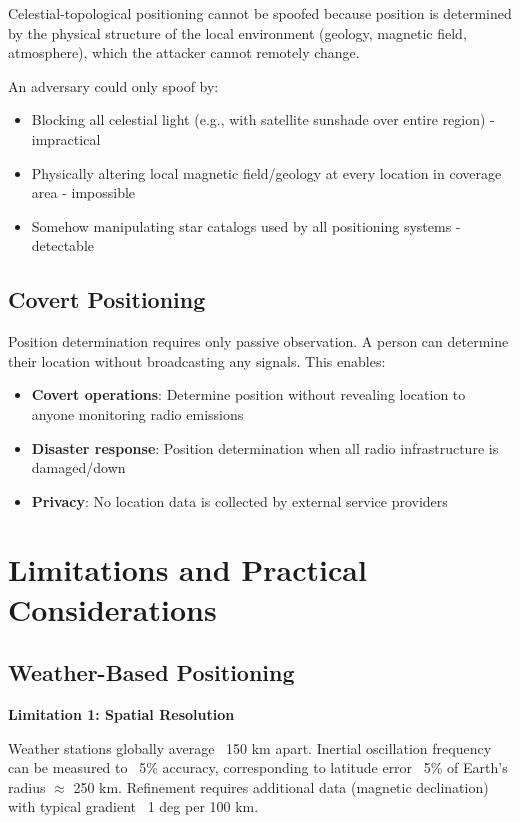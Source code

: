 \documentclass[11pt,twocolumn,a4paper]{article}
\theoremstyle{definition}
\begin{document}
Celestial-topological positioning cannot be spoofed because position is determined by the physical structure of the local environment (geology, magnetic field, atmosphere), which the attacker cannot remotely change.

An adversary could only spoof by:
\begin{itemize}[nosep]
\item Blocking all celestial light (e.g., with satellite sunshade over entire region) - impractical
\item Physically altering local magnetic field/geology at every location in coverage area - impossible
\item Somehow manipulating star catalogs used by all positioning systems - detectable
\end{itemize}

\subsection{Covert Positioning}

Position determination requires only passive observation. A person can determine their location without broadcasting any signals. This enables:
\begin{itemize}[nosep]
\item \textbf{Covert operations}: Determine position without revealing location to anyone monitoring radio emissions
\item \textbf{Disaster response}: Position determination when all radio infrastructure is damaged/down
\item \textbf{Privacy}: No location data is collected by external service providers
\end{itemize}

\section{Limitations and Practical Considerations}
\label{sec:limitations}

\subsection{Weather-Based Positioning}

\textbf{Limitation 1: Spatial Resolution}

Weather stations globally average ~150 km apart. Inertial oscillation frequency can be measured to ~5\% accuracy, corresponding to latitude error ~5\% of Earth's radius $\approx$ 250 km. Refinement requires additional data (magnetic declination) with typical gradient ~1 deg per 100 km.
\end{document}
